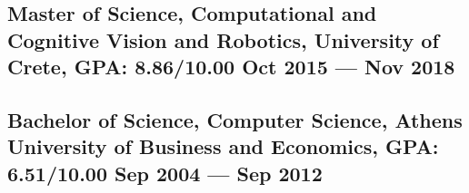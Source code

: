 \documentclass[a4,8pt]{article}
\begin{document}
\subsection*{Master of Science, Computational and Cognitive Vision and Robotics, {\normalsize \normalfont University of Crete, GPA: 8.86/10.00} \hfill Oct 2015 --- Nov 2018} 
\vspace{0.1cm}
\subsection*{Bachelor of Science, Computer Science, {\normalsize \normalfont Athens University of Business and Economics, GPA: 6.51/10.00} \hfill Sep 2004 --- Sep 2012} 
\vspace{0.2cm}



\linespread{0.82}
\end{document}
